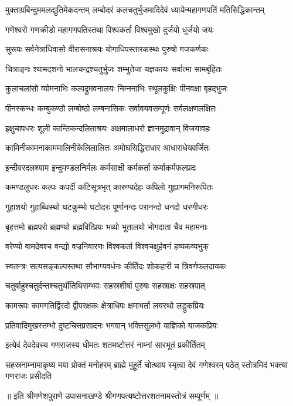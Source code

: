 
{मुक्ताग्रबिन्दुममलद्युतिमेकदन्तम्}
{लम्बोदरं कलचतुर्भुजमादिदेवं}
{ध्यायेन्महागणपतिं मतिसिद्धिकान्तम्}

\twolineshloka
{गणेश्वरो गणक्रीडो महागणपतिस्तथा}
{विश्वकर्ता विश्वमुखो दुर्जयो धूर्जयो जयः}

\twolineshloka
{सुरूपः सर्वनेत्राधिवासो वीरासनाश्रयः}
{योगाधिपस्तारकस्थः पुरुषो गजकर्णकः}

\twolineshloka
{चित्राङ्गः श्यामदशनो भालचन्द्रश्चतुर्भुजः}
{शम्भुतेजा यज्ञकायः सर्वात्मा सामबृंहितः}

\twolineshloka
{कुलाचलांसो व्योमनाभिः कल्पद्रुमवनालयः}
{निम्ननाभिः स्थूलकुक्षिः पीनवक्षा बृहद्भुजः}

\twolineshloka
{पीनस्कन्धः कम्बुकण्ठो लम्बोष्ठो लम्बनासिकः}
{सर्वावयवसम्पूर्णः सर्वलक्षणलक्षितः}

\twolineshloka
{इक्षुचापधरः शूली कान्तिकन्दलिताश्रयः}
{अक्षमालाधरो ज्ञानमुद्रावान् विजयावहः}

\twolineshloka
{कामिनीकामनाकाममालिनीकेलिलालितः}
{अमोघसिद्धिराधार आधाराधेयवर्जितः}

\twolineshloka
{इन्दीवरदलश्याम इन्दुमण्डलनिर्मलः}
{कर्मसाक्षी कर्मकर्ता कर्माकर्मफलप्रदः}

\twolineshloka
{कमण्डलुधरः कल्पः कपर्दी कटिसूत्रभृत्}
{कारुण्यदेहः कपिलो गुह्यागमनिरूपितः}

\twolineshloka
{गुहाशयो गुहाब्धिस्थो घटकुम्भो घटोदरः}
{पूर्णानन्दः परानन्दो धनदो धरणीधरः}

\twolineshloka
{बृहत्तमो ब्रह्मपरो ब्रह्मण्यो ब्रह्मवित्प्रियः}
{भव्यो भूतालयो भोगदाता चैव महामनाः}

\twolineshloka
{वरेण्यो वामदेवश्च वन्द्यो वज्रनिवारणः}
{विश्वकर्ता विश्वचक्षुर्हवनं हव्यकव्यभुक्}

\twolineshloka
{स्वतन्त्रः सत्यसङ्कल्पस्तथा सौभाग्यवर्धनः}
{कीर्तिदः शोकहारी च त्रिवर्गफलदायकः}

\twolineshloka
{चतुर्बाहुश्चतुर्दन्तश्चतुर्थीतिथिसम्भवः}
{सहस्रशीर्षा पुरुषः सहस्राक्षः सहस्रपात्}

\twolineshloka
{कामरूपः कामगतिर्द्विरदो द्वीपरक्षकः}
{क्षेत्राधिपः क्षमाभर्ता लयस्थो लड्डुकप्रियः}

\twolineshloka
{प्रतिवादिमुखस्तम्भो दुष्टचित्तप्रसादनः}
{भगवान् भक्तिसुलभो याज्ञिको याजकप्रियः}

\twolineshloka
{इत्येवं देवदेवस्य गणराजस्य धीमतः}
{शतमष्टोत्तरं नाम्नां सारभूतं प्रकीर्तितम्}

\threelineshloka
{सहस्रनाम्नामाकृष्य मया प्रोक्तं मनोहरम्}
{ब्राह्मे मुहूर्ते चोत्थाय स्मृत्वा देवं गणेश्वरम्}
{पठेत् स्तोत्रमिदं भक्त्या गणराजः प्रसीदति}

{॥ इति श्रीगणेशपुराणे उपासनाखण्डे श्रीगणपत्यष्टोत्तरशतनामस्तोत्रं सम्पूर्णम् ॥}
